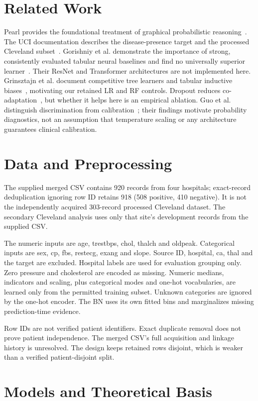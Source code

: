 \documentclass[conference]{IEEEtran}
\begin{document}
\section{Related Work}
Pearl provides the foundational treatment of graphical probabilistic reasoning~\cite{pearl}. The UCI documentation describes the disease-presence target and the processed Cleveland subset~\cite{uci}. Gorishniy et al. demonstrate the importance of strong, consistently evaluated tabular neural baselines and find no universally superior learner~\cite{gorishniy}. Their ResNet and Transformer architectures are not implemented here. Grinsztajn et al. document competitive tree learners and tabular inductive biases~\cite{grinsztajn}, motivating our retained LR and RF controls. Dropout reduces co-adaptation~\cite{dropout}, but whether it helps here is an empirical ablation. Guo et al. distinguish discrimination from calibration~\cite{guo}; their findings motivate probability diagnostics, not an assumption that temperature scaling or any architecture guarantees clinical calibration.
\section{Data and Preprocessing}
The supplied merged CSV contains 920 records from four hospitals; exact-record deduplication ignoring row ID retains 918 (508 positive, 410 negative). It is not the independently acquired 303-record processed Cleveland dataset. The secondary Cleveland analysis uses only that site's development records from the supplied CSV.

The numeric inputs are age, trestbps, chol, thalch and oldpeak. Categorical inputs are sex, cp, fbs, restecg, exang and slope. Source ID, hospital, ca, thal and the target are excluded. Hospital labels are used for evaluation grouping only. Zero pressure and cholesterol are encoded as missing. Numeric medians, indicators and scaling, plus categorical modes and one-hot vocabularies, are learned only from the permitted training subset. Unknown categories are ignored by the one-hot encoder. The BN uses its own fitted bins and marginalizes missing prediction-time evidence.

Row IDs are not verified patient identifiers. Exact duplicate removal does not prove patient independence. The merged CSV's full acquisition and linkage history is unresolved. The design keeps retained rows disjoint, which is weaker than a verified patient-disjoint split.
\section{Models and Theoretical Basis}
\end{document}
